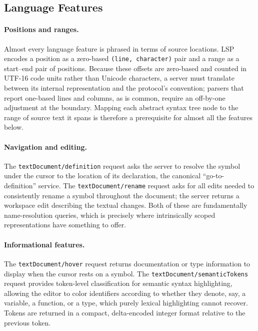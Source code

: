 \subsection{Language Features}
\label{subsec:lsp-features}

\paragraph{Positions and ranges.}
Almost every language feature is phrased in terms of source locations. 
LSP encodes a position as a zero-based \texttt{(line, character)} pair and a range as a start--end pair of positions. 
Because these offsets are zero-based and counted in UTF-16 code units rather than Unicode characters, a server must translate between its internal representation and the protocol's convention; parsers that report one-based lines and columns, as is common, require an off-by-one adjustment at the boundary. 
Mapping each abstract syntax tree node to the range of source text it spans is therefore a prerequisite for almost all the features below.

\paragraph{Navigation and editing.}
The \texttt{textDocument/definition} request asks the server to resolve the symbol under the cursor to the location of its declaration, the canonical ``go-to-definition'' service. 
The \texttt{textDocument/rename} request asks for all edits needed to consistently rename a symbol throughout the document; the server returns a workspace edit describing the textual changes. 
Both of these are fundamentally name-resolution queries, which is precisely where intrinsically scoped representations have something to offer.

\paragraph{Informational features.}
The \texttt{textDocument/hover} request returns documentation or type information to display when the cursor rests on a symbol. 
The \texttt{textDocument/semanticTokens} request provides token-level classification for semantic syntax highlighting, allowing the editor to color identifiers according to whether they denote, say, a variable, a function, or a type, which purely lexical highlighting cannot recover. 
Tokens are returned in a compact, delta-encoded integer format relative to the previous token.

